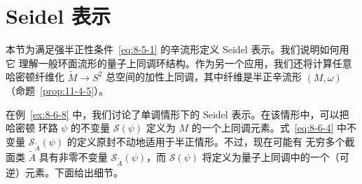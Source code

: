 
\section{Seidel 表示}\label{sec:11-4}

本节为满足强半正性条件~\eqref{eq:8-5-1} 的辛流形定义 Seidel 表示。我们说明如何用它
理解一般环面流形的量子上同调环结构。作为另一个应用，我们还将计算任意哈密顿纤维化
$\widetilde M\to S^2$ 总空间的加性上同调，其中纤维是半正辛流形 $(M,\omega)$
（命题~\ref{prop:11-4-5}）。

在例~\ref{ex:8-6-8} 中，我们讨论了单调情形下的 Seidel 表示。在该情形中，可以把哈密顿
环路 $\psi$ 的不变量 $\mathcal S(\psi)$ 定义为 $M$ 的一个上同调元素。式~\eqref{eq:8-6-4}
中不变量 $\mathcal S_{\widetilde A}(\psi)$ 的定义原封不动地适用于半正情形。不过，现在可能有
无穷多个截面类 $\widetilde A$ 具有非零不变量 $\mathcal S_{\widetilde A}(\psi)$，而
$\mathcal S(\psi)$ 将定义为量子上同调中的一个（可逆）元素。下面给出细节。

